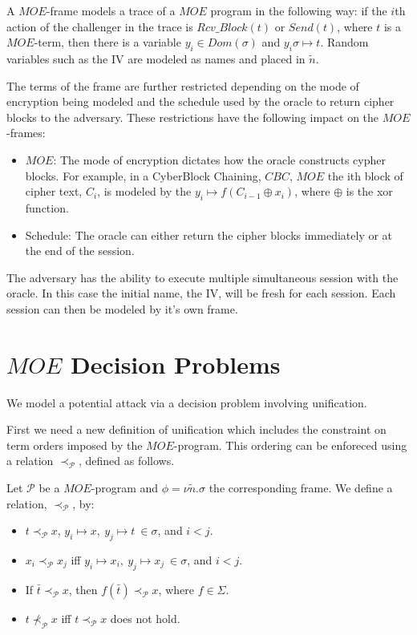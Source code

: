 \documentclass{llncs}
\begin{document}
A $MOE$-frame models a trace of a $MOE$ program in the following way:
if the $i$th action of the challenger in the trace is 
$Rcv\_Block(t)$ or $Send(t)$, where $t$ is a $MOE$-term, 
then there is a variable $y_i \in Dom(\sigma)$ and 
$y_i \sigma \mapsto t$. Random variables such as the IV are 
modeled as names and placed in $\tilde{n}$.

The terms of the frame are further restricted depending on the mode of encryption being modeled and the schedule used by the oracle to
return cipher blocks to the adversary. These restrictions have
the following impact on the $MOE$-frames:
\begin{itemize}
	\item $MOE$: The mode of encryption dictates how the oracle 
	constructs cypher blocks. For example, in a CyberBlock Chaining,
	$CBC$, $MOE$ the ith block of cipher text, $C_i$, is modeled by
	the $y_i \mapsto f(C_{i-1} \oplus x_i)$, where $\oplus$ is
	the xor function.
	\item Schedule: The oracle can either return the 
	cipher blocks immediately or at the end of the session.  
\end{itemize}

The adversary has the ability to execute multiple simultaneous session with the oracle. In this case the initial name, the IV, will be fresh for each session. Each session can then be modeled by it's own frame. 




\section{$MOE$ Decision Problems}

We model a potential attack via a decision problem involving unification. 

First we need a new definition of unification which includes the 
constraint on term orders imposed by the $MOE$-program. This 
ordering can be enforeced using a relation $\prec_{\mathcal{P}}$, defined 
as follows. 

\begin{definition}
	Let $\mathcal{P}$ be a $MOE$-program and $\phi = \nu \tilde{n}.\sigma$ the corresponding frame. We define a relation, 
	$\prec_{\mathcal{P}}$, by:
	\begin{itemize}
		\item $t \prec_{\mathcal{P}} x$,
		$y_i \mapsto x, ~y_j \mapsto t ~ \in \sigma$, and
		$ i < j$.
		\item $x_i \prec_{\mathcal{P}} x_j$ iff 
		 $y_i \mapsto x_i, ~y_j \mapsto x_j ~ \in \sigma$, and
		 $ i < j$.
		 \item If $\bar{t} \prec_{\mathcal{P}} x$, then 
		 $f(\bar{t}) \prec_{\mathcal{P}} x$, where $f \in \Sigma$.
		 \item $t \not \prec_{\mathcal{P}} x$ iff $t \prec_{\mathcal{P}} x$ does not hold.
	\end{itemize}
\end{definition}
\end{document}
